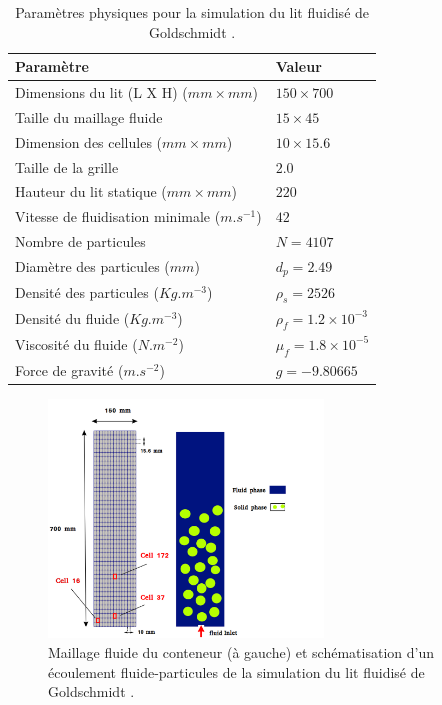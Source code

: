 \begin{center}
\begin{table}[!h]
\begin{tabular}{ |p{7cm}|p{6cm}| }
 \hline \rowcolor{lightgray}

 Paramètre& Valeur\\
 \hline
 Dimensions du lit (L X H) ($mm \times mm$)& $150 \times 700$\\
 Taille du maillage fluide  & $15 \times 45$\\
 Dimension des cellules ($mm \times mm$)& $10 \times 15.6$\\
 Taille de la grille & $2.0$ \\
 Hauteur du lit statique ($mm \times mm$) & $220$\\
 Vitesse de fluidisation minimale ($m.s^{-1}$)&   $42$\\
 Nombre de particules& $N = 4107$\\
 Diamètre des particules ($mm$)& $d_p = 2.49$\\
 Densité des particules ($Kg.m^{-3}$)& $\rho_s = 2526$\\
 Densité du fluide ($Kg.m^{-3}$)& $\rho_f = 1.2\times10^{-3}$\\
 Viscosité du fluide ($N.m^{-2}$)& $\mu_f = 1.8\times10^{-5}$\\
 Force de gravité ($m.s^{-2}$)& $g = -9.80665$\\
 \hline
\end{tabular}
\caption{Paramètres physiques pour la simulation du lit fluidisé de Goldschmidt \cite{goldschmidt2004hydrodynamic}.}\label{tab_fluide_phys}
\end{table}
\end{center}

\vspace{-1cm}

\begin{figure}[!h]
  \centering
    \includegraphics[width=0.65\textwidth]{chapitres/chapitre_4/figures/maillage.png}
    \caption{\centering Maillage fluide du conteneur (à gauche) et schématisation d'un écoulement fluide-particules de la simulation du lit fluidisé de Goldschmidt \cite{goldschmidt2004hydrodynamic}.}\label{maillage_lit}
\end{figure}

